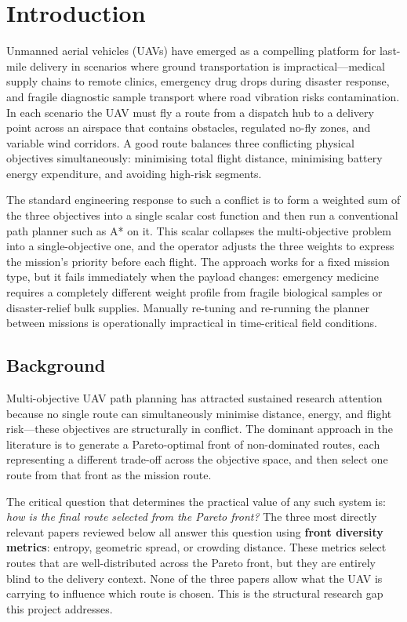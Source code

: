\documentclass{ssnreview}
\begin{document}
\chapter{Introduction}

Unmanned aerial vehicles (UAVs) have emerged as a compelling platform for last-mile
delivery in scenarios where ground transportation is impractical---medical supply chains
to remote clinics, emergency drug drops during disaster response, and fragile diagnostic
sample transport where road vibration risks contamination. In each scenario the UAV must
fly a route from a dispatch hub to a delivery point across an airspace that contains
obstacles, regulated no-fly zones, and variable wind corridors. A good route balances
three conflicting physical objectives simultaneously: minimising total flight distance,
minimising battery energy expenditure, and avoiding high-risk segments.

The standard engineering response to such a conflict is to form a weighted sum of the
three objectives into a single scalar cost function and then run a conventional path
planner such as A* on it. This scalar collapses the multi-objective problem into a
single-objective one, and the operator adjusts the three weights to express the
mission's priority before each flight. The approach works for a fixed mission type, but
it fails immediately when the payload changes: emergency medicine requires a completely
different weight profile from fragile biological samples or disaster-relief bulk
supplies. Manually re-tuning and re-running the planner between missions is
operationally impractical in time-critical field conditions.

\section{Background}

Multi-objective UAV path planning has attracted sustained research attention because no
single route can simultaneously minimise distance, energy, and flight risk---these
objectives are structurally in conflict. The dominant approach in the literature is to
generate a Pareto-optimal front of non-dominated routes, each representing a different
trade-off across the objective space, and then select one route from that front as the
mission route.

The critical question that determines the practical value of any such system is:
\textit{how is the final route selected from the Pareto front?} The three most directly
relevant papers reviewed below all answer this question using \textbf{front diversity
metrics}: entropy, geometric spread, or crowding distance. These metrics select routes
that are well-distributed across the Pareto front, but they are entirely blind to the
delivery context. None of the three papers allow what the UAV is carrying to influence
which route is chosen. This is the structural research gap this project addresses.
\end{document}
